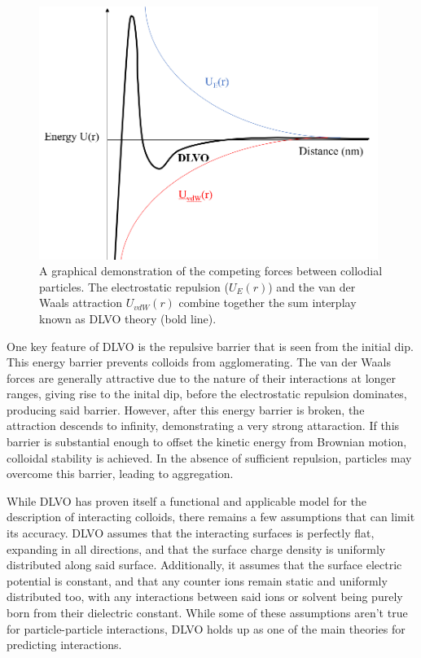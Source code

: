 \begin{figure}[h]     %
        \begin{center}
          \includegraphics[width=110mm]{chapter1/DLVO.PNG}
\end{center}
\caption{A graphical demonstration of the competing forces between collodial particles. The electrostatic repulsion ($U_E(r)$) and the van der Waals attraction $U_{vdW}(r)$ combine together the sum interplay known as DLVO theory (bold line).}
\label{fig:DLVO}                 %
\end{figure}

One key feature of DLVO is the repulsive barrier that is seen from the initial dip. This energy barrier prevents colloids from agglomerating. The van der Waals forces are generally attractive due to the nature of their interactions at longer ranges, giving rise to the inital dip, before the electrostatic repulsion dominates, producing said barrier. However, after this energy barrier is broken, the attraction descends to infinity, demonstrating a very strong attaraction. If this barrier is substantial enough to offset the kinetic energy from Brownian motion, colloidal stability is achieved. In the absence of sufficient repulsion, particles may overcome this barrier, leading to aggregation.

While DLVO has proven itself a functional and applicable model for the description of interacting colloids, there remains a few assumptions that can limit its accuracy. DLVO assumes that the interacting surfaces is perfectly flat, expanding in all directions, and that the surface charge density is uniformly distributed along said surface. Additionally, it assumes that the surface electric potential is constant, and that any counter ions remain static and uniformly distributed too, with any interactions between said ions or solvent being purely born from their dielectric constant. While some of these assumptions aren't true for particle-particle interactions, DLVO holds up as one of the main theories for predicting interactions. \cite{particledep} \cite{effectHetSurf} \cite{colloidDepKin} \cite{chemDiscCharge} \cite{DLVOreview} 

